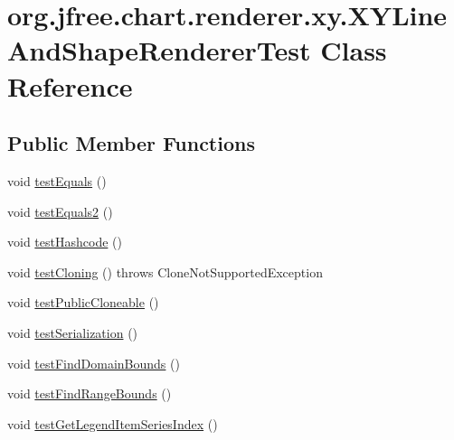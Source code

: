 \hypertarget{classorg_1_1jfree_1_1chart_1_1renderer_1_1xy_1_1_x_y_line_and_shape_renderer_test}{}\section{org.\+jfree.\+chart.\+renderer.\+xy.\+X\+Y\+Line\+And\+Shape\+Renderer\+Test Class Reference}
\label{classorg_1_1jfree_1_1chart_1_1renderer_1_1xy_1_1_x_y_line_and_shape_renderer_test}
\subsection*{Public Member Functions}
\begin{DoxyCompactItemize}
\item 
void \mbox{\hyperlink{classorg_1_1jfree_1_1chart_1_1renderer_1_1xy_1_1_x_y_line_and_shape_renderer_test_a2f02c112614af0daca42dbbab69b15bc}{test\+Equals}} ()
\item 
void \mbox{\hyperlink{classorg_1_1jfree_1_1chart_1_1renderer_1_1xy_1_1_x_y_line_and_shape_renderer_test_ab8323a8b93d58da2814406075f42b890}{test\+Equals2}} ()
\item 
void \mbox{\hyperlink{classorg_1_1jfree_1_1chart_1_1renderer_1_1xy_1_1_x_y_line_and_shape_renderer_test_a0adf1a2362f556d107f460172a6cb210}{test\+Hashcode}} ()
\item 
void \mbox{\hyperlink{classorg_1_1jfree_1_1chart_1_1renderer_1_1xy_1_1_x_y_line_and_shape_renderer_test_a6e0a6dd70aefd708ebcc2c9c418bb072}{test\+Cloning}} ()  throws Clone\+Not\+Supported\+Exception 
\item 
void \mbox{\hyperlink{classorg_1_1jfree_1_1chart_1_1renderer_1_1xy_1_1_x_y_line_and_shape_renderer_test_a6ea61d1b1d32721db74a796f9c8cf2fe}{test\+Public\+Cloneable}} ()
\item 
void \mbox{\hyperlink{classorg_1_1jfree_1_1chart_1_1renderer_1_1xy_1_1_x_y_line_and_shape_renderer_test_ade348bd672bdaf268a00fd27f9d7a929}{test\+Serialization}} ()
\item 
void \mbox{\hyperlink{classorg_1_1jfree_1_1chart_1_1renderer_1_1xy_1_1_x_y_line_and_shape_renderer_test_a5a75e7c6c731e03d7c71e5dae90830f7}{test\+Find\+Domain\+Bounds}} ()
\item 
void \mbox{\hyperlink{classorg_1_1jfree_1_1chart_1_1renderer_1_1xy_1_1_x_y_line_and_shape_renderer_test_a3275df6c7cbf24e9406c91d29756369f}{test\+Find\+Range\+Bounds}} ()
\item 
void \mbox{\hyperlink{classorg_1_1jfree_1_1chart_1_1renderer_1_1xy_1_1_x_y_line_and_shape_renderer_test_adf007cbd58f61548d2e7f5a88a52571e}{test\+Get\+Legend\+Item\+Series\+Index}} ()
\end{DoxyCompactItemize}


